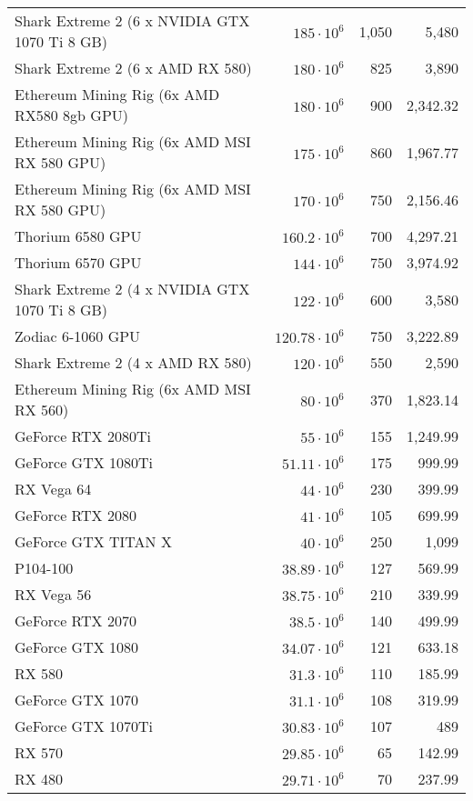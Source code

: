 \begin{longtable}{|p{}|r|r|r|}
  Shark Extreme 2 (6 x NVIDIA GTX 1070 Ti 8 GB) & $185 \cdot 10^{6}$ & 1,050 & 5,480 \\
  Shark Extreme 2 (6 x AMD RX 580) & $180 \cdot 10^{6}$ & 825 & 3,890 \\
  Ethereum Mining Rig (6x AMD RX580 8gb GPU) & $180 \cdot 10^{6}$ & 900 & 2,342.32 \\
  Ethereum Mining Rig (6x AMD MSI RX 580 GPU) & $175 \cdot 10^{6}$ & 860 & 1,967.77 \\
  Ethereum Mining Rig (6x AMD MSI RX 580 GPU) & $170 \cdot 10^{6}$ & 750 & 2,156.46 \\
  Thorium 6580 GPU & $160.2 \cdot 10^{6}$ & 700 & 4,297.21 \\
  Thorium 6570 GPU & $144 \cdot 10^{6}$ & 750 & 3,974.92 \\
  Shark Extreme 2 (4 x NVIDIA GTX 1070 Ti 8 GB) & $122 \cdot 10^{6}$ & 600 & 3,580 \\
  Zodiac 6-1060 GPU & $120.78 \cdot 10^{6}$ & 750 & 3,222.89 \\
  Shark Extreme 2 (4 x AMD RX 580) & $120 \cdot 10^{6}$ & 550 & 2,590 \\
  Ethereum Mining Rig (6x AMD MSI RX 560) & $80 \cdot 10^{6}$ & 370 & 1,823.14 \\
  GeForce RTX 2080Ti & $55 \cdot 10^{6}$ & 155 & 1,249.99 \\
  GeForce GTX 1080Ti & $51.11 \cdot 10^{6}$ & 175 & 999.99 \\
  RX Vega 64 & $44 \cdot 10^{6}$ & 230 & 399.99 \\
  GeForce RTX 2080 & $41 \cdot 10^{6}$ & 105 & 699.99 \\
  GeForce GTX TITAN X & $40 \cdot 10^{6}$ & 250 & 1,099 \\
  P104-100 & $38.89 \cdot 10^{6}$ & 127 & 569.99 \\
  RX Vega 56 & $38.75 \cdot 10^{6}$ & 210 & 339.99 \\
  GeForce RTX 2070 & $38.5 \cdot 10^{6}$ & 140 & 499.99 \\
  GeForce GTX 1080 & $34.07 \cdot 10^{6}$ & 121 & 633.18 \\
  RX 580 & $31.3 \cdot 10^{6}$ & 110 & 185.99 \\
  GeForce GTX 1070 & $31.1 \cdot 10^{6}$ & 108 & 319.99 \\
  GeForce GTX 1070Ti & $30.83 \cdot 10^{6}$ & 107 & 489 \\
  RX 570 & $29.85 \cdot 10^{6}$ & 65 & 142.99 \\
  RX 480 & $29.71 \cdot 10^{6}$ & 70 & 237.99 \\

\end{longtable}
